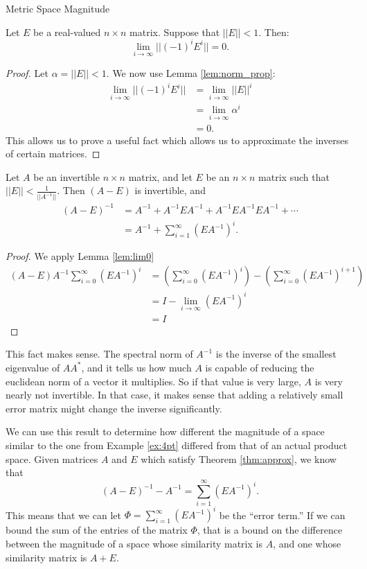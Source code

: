 \documentclass[12pt]{pom_thesis}
\begin{document}
\begin{chapter}{Metric Space Magnitude}
\begin{lemma}\label{lem:lim0}
Let $E$ be a real-valued $n \times n$ matrix. Suppose that $||E|| < 1$. Then:
\[
\lim_{i \rightarrow \infty}||(-1)^i E^i|| = 0.
\]
\end{lemma}
\begin{proof}
Let $\alpha = ||E|| <1$. We now use Lemma \ref{lem:norm_prop}:
\begin{align*}
\lim_{i \rightarrow \infty}||(-1)^i E^i|| &= \lim_{i \rightarrow \infty}||E||^i\\
&= \lim_{i \rightarrow \infty}\alpha^i\\
&= 0.
\end{align*}
This allows us to prove a useful fact which allows us to approximate the inverses of certain matrices.
\end{proof}
\begin{thm}\label{thm:approx}
Let $A$ be an invertible $n \times n$ matrix, and let $E$ be an $n \times n$ matrix such that $||E|| < \frac 1{||A^{-1}||}$. Then $(A-E)$ is invertible, and
\begin{align*}
(A - E)^{-1} &= A^{-1} + A^{-1}EA^{-1} + A^{-1}EA^{-1}EA^{-1} + \cdots\\
&= A^{-1} + \sum_{i = 1}^\infty (EA^{-1})^i.
\end{align*}
\end{thm}
\begin{proof}
We apply Lemma \ref{lem:lim0}
\begin{align*}
(A-E)  A^{-1}\sum_{i = 0}^\infty (EA^{-1})^i
&= \left(\sum_{i = 0}^\infty (EA^{-1})^i\right) - \left( \sum_{i = 0}^\infty (EA^{-1})^{i+1}\right)\\
&= I - \lim_{i \rightarrow \infty} (EA^{-1})^i\\
&= I
\end{align*}
\end{proof}
This fact makes sense. The spectral norm of $A^{-1}$ is the inverse of the smallest eigenvalue of $AA^*$, and it tells us how much $A$ is capable of reducing the euclidean norm of a vector it multiplies. So if that value is very large, $A$ is very nearly not invertible. In that case, it makes sense that adding a relatively small error matrix might change the inverse significantly. 

We can use this result to determine how different the magnitude of a space similar to the one from Example \ref{ex:4pt} differed from that of an actual product space. Given matrices $A$ and $E$ which satisfy Theorem \ref{thm:approx}, we know that 
\[
(A - E)^{-1} - A^{-1} = \sum_{i = 1}^\infty (EA^{-1})^i.
\]
This means that we can let $\Phi = \sum_{i = 1}^\infty (EA^{-1})^i$ be the ``error term.'' If we can bound the sum of the entries of the matrix $\Phi$, that is a bound on the difference between the magnitude of a space whose similarity matrix is $A$, and one whose similarity matrix is $A + E$. 


\end{chapter}
\end{document}
